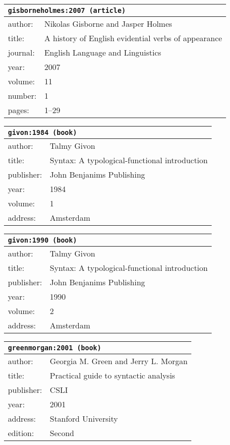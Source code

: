 \documentclass{article}
\begin{document}
\bigskip

\begin{tabular}{p{}p{}}
\multicolumn{2}{l}{\texttt{gisborneholmes:2007 (article)}}\\
\hline
author: & Nikolas Gisborne and Jasper Holmes\\
title: & A history of \textsc{E}nglish evidential verbs of appearance\\
journal: & English Language and Linguistics\\
year: & 2007\\
volume: & 11\\
number: & 1\\
pages: & 1--29\\
\end{tabular}

\bigskip

\begin{tabular}{p{}p{}}
\multicolumn{2}{l}{\texttt{givon:1984 (book)}}\\
\hline
author: & Talmy Givon\\
title: & Syntax: A typological-functional introduction\\
publisher: & John Benjanims Publishing\\
year: & 1984\\
volume: & 1\\
address: & Amsterdam\\
\end{tabular}

\bigskip

\begin{tabular}{p{}p{}}
\multicolumn{2}{l}{\texttt{givon:1990 (book)}}\\
\hline
author: & Talmy Givon\\
title: & Syntax: A typological-functional introduction\\
publisher: & John Benjanims Publishing\\
year: & 1990\\
volume: & 2\\
address: & Amsterdam\\
\end{tabular}

\bigskip

\begin{tabular}{p{}p{}}
\multicolumn{2}{l}{\texttt{greenmorgan:2001 (book)}}\\
\hline
author: & Georgia M. Green and Jerry L. Morgan\\
title: & Practical guide to syntactic analysis\\
publisher: & CSLI\\
year: & 2001\\
address: & Stanford University\\
edition: & Second\\
\end{tabular}
\end{document}
